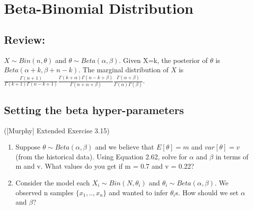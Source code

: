 \documentclass{harvardml}
\theoremstyle{definition}
\theoremstyle{plain}
\begin{document}

\section{Beta-Binomial Distribution}
\subsection{Review: }
$X\sim Bin(n, \theta)$ and $\theta\sim Beta(\alpha, \beta)$. Given X=k, the posterior of $\theta$ is $Beta(\alpha + k, \beta + n - k)$. The marginal distribution of $X$ is ${\frac  {\Gamma (n+1)}{\Gamma (k+1)\Gamma (n-k+1)}}{\frac  {\Gamma (k+\alpha )\Gamma (n-k+\beta )}{\Gamma (n+\alpha +\beta )}}{\frac  {\Gamma (\alpha +\beta )}{\Gamma (\alpha )\Gamma (\beta )}}$.
\subsection{Setting the beta hyper-parameters}
([Murphy] Extended Exercise 3.15) 
\begin{enumerate}
\item Suppose $\theta\sim Beta(\alpha, \beta)$ and we believe that $E [\theta] = m$ and $var [\theta] = v$ (from the historical data). Using Equation 2.62, solve for $\alpha$ and $\beta$ in terms of m and v. What values do you get if m = 0.7 and v = 0.22?

\item Consider the model each $X_i\sim Bin(N, \theta_i)$ and $\theta_i\sim Beta(\alpha, \beta)$. We observed n samples $\{x_1, .., x_n\}$ and wanted to infer $\theta_i$s. How should we set $\alpha$ and $\beta$? 

\end{enumerate}
\end{document}

